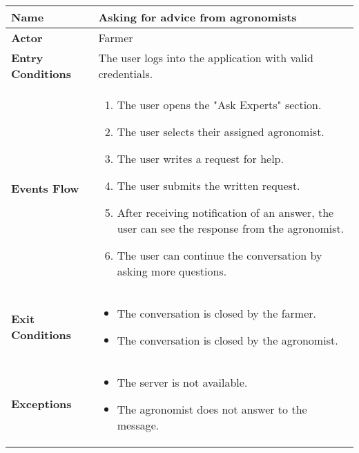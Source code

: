 \begin{center}
\renewcommand{\arraystretch}{1.25}

\begin{tabular}{|l|>{\raggedright\arraybackslash}m{12cm}|}

    \hline
    \textbf{Name} & Asking for advice from agronomists\\
    \hline
   	\textbf{Actor} & Farmer\\
    \hline
    \textbf{Entry Conditions} & The user logs into the application with valid credentials.\\
    \hline
    
    \textbf{Events Flow} & 
    		\begin{enumerate}
    			\item The user opens the "Ask Experts" section.
    			\item The user selects their assigned agronomist.
    			\item The user writes a request for help.
    			\item The user submits the written request.
    			\item After receiving notification of an answer, the user can see the response from the agronomist.
    			\item The user can continue the conversation by asking more questions.
    		\end{enumerate}
    	\\
    \hline
    \textbf{Exit Conditions} & \begin{itemize}
    	\item The conversation is closed by the farmer.
    	\item The conversation is closed by the agronomist.
    	\end{itemize}
    	\\
    \hline
    \textbf{Exceptions} & 
    		\begin{itemize}
    		    	\item The server is not available.
    			\item The agronomist does not answer to the message.
    		\end{itemize}
    \\
    \hline
\end{tabular}
\end{center}